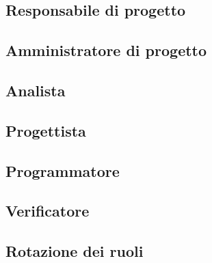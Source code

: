 \documentclass[float=false, crop=false]{standalone}
\begin{document}
		\subsection{Responsabile di progetto}
		
		\subsection{Amministratore di progetto}
		\subsection{Analista}
		\subsection{Progettista}
		\subsection{Programmatore}
		\subsection{Verificatore}
		\subsection{Rotazione dei ruoli}
\end{document}
